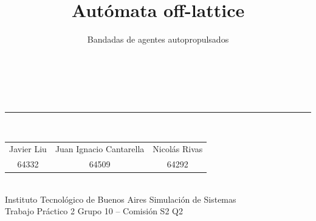 \documentclass[aspectratio=169,11pt]{beamer}
\title{Autómata off-lattice}
\subtitle{Bandadas de agentes autopropulsados}
\begin{document}
\begin{frame}
    \vfill
    \begin{center}
        {\inserttitle}\\[0.3em]
        {\large\color{gris}\insertsubtitle}\\[1.0em]
        \textcolor{azul!30}{\rule{0.45\textwidth}{1pt}}\\[1.0em]
        {\small
        \begin{tabular}{ccc}
            Javier Liu & Juan Ignacio Cantarella & Nicolás Rivas \\[0.15em]
            {\footnotesize\color{gris}64332} &
            {\footnotesize\color{gris}64509} &
            {\footnotesize\color{gris}64292}
        \end{tabular}}\\[1.4em]
        {\footnotesize Instituto Tecnológico de Buenos Aires \quad\textbar\quad Simulación de Sistemas}\\[0.3em]
        {\footnotesize\color{gris} Trabajo Práctico 2 \enspace\textbar\enspace Grupo 10 -- Comisión S2 \enspace\textbar{} Q2}
    \end{center}
    \vfill
\end{frame}

\AtBeginSection[]{%
    \begin{frame}
        \vfill
        \begin{center}
            {\Large\bfseries\color{azul}\insertsectionhead}\\[0.5em]
            \textcolor{azul!30}{\rule{0.28\textwidth}{1pt}}
        \end{center}
        \vfill
    \end{frame}}

\AtBeginSubsection[]{%
    \begin{frame}
        \vfill
        \begin{center}
            {\small\color{gris}\insertsectionhead}\\[0.5em]
            {\Large\bfseries\color{azul}\insertsubsectionhead}\\[0.5em]
            \textcolor{azul!30}{\rule{0.28\textwidth}{1pt}}
        \end{center}
        \vfill
    \end{frame}}
\end{document}
